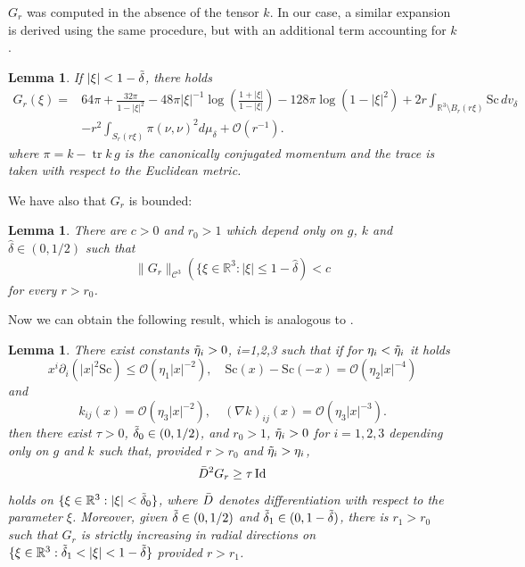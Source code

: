 \documentclass[12pt,a4paper]{amsart}
\theoremstyle{plain}
\newtheorem{lemma}[theorem]{Lemma}
\theoremstyle{definition}
\newcommand{\tr}{\operatorname{tr}}
\begin{document}
$G_r$ was computed in the absence of the tensor $k$. In our case, a similar expansion is derived using the same procedure, but with an additional term accounting for $k$.
\begin{lemma}
    If \(|\xi| < 1 - \Tilde{\delta}\), there holds
\[
\begin{split}
G_r(\xi) =& 64 \pi + \frac{32 \pi}{1 - |\xi|^2} - 48 \pi |\xi|^{-1} \log \left( \frac{1 + |\xi|}{1 - |\xi|} \right) - 128 \pi \log(1 - |\xi|^2) + 2 r \int_{\mathbb{R}^3 \setminus B_r(r \xi)} \mathrm{Sc} \, dv_\delta \\
&-r^2 \int_{S_r(r \xi)} \pi(\nu,\nu)^2 d\mu_\delta +  \mathcal{O} (r^{-1}).
\end{split}
\]
where  $\pi= k-\tr k \, g $ is the canonically conjugated momentum and the trace is taken with respect to the Euclidean metric.
\end{lemma}
We have also that $G_r$ is bounded:
\begin{lemma}\label{bounded}
    There are \(c > 0\) and \(r_0 > 1\) which depend only on \(g\), $k$ and \( \hat{\delta} \in (0, 1/2)\) such that
\[
\|G_r\|_{\mathcal{C}^3}(\{\xi \in \mathbb{R}^3 : |\xi| \leq 1 - \hat{\delta} ) < c
\]
for every \(r > r_0\).
\end{lemma}
Now we can obtain the following result, which is analogous to \cite[Lemma 24]{eichko}. 
\begin{lemma}\label{convexity}
There exist constants $ \Tilde{\eta}_i>0$, i=1,2,3 such that if for $\eta_i< \Tilde{\eta}_i $ it holds 
\begin{equation}
    x^i \partial_i (|x|^2 \mathrm{Sc}) \leq \mathcal{O} (\eta_1 |x|^{-2}),\quad  \mathrm{Sc}(x)-\mathrm{Sc}(-x) = \mathcal{O} (\eta_2 |x|^{-4})
\end{equation}
and 
\begin{equation}
k_{ij}(x) = \mathcal{O}(\eta_3 |x|^{-2}) , \quad (\nabla k)_{ij}(x)= \mathcal{O}(\eta_3 |x|^{-3}). 
\end{equation}
then there exist
\(\tau > 0\), \(\Tilde{\delta}_0 \in (0, 1/2)\), and \(r_0 > 1\), $\Tilde{\eta}_i>0$ for $i=1,2,3$ depending only on \(g\) and $k$ such that, provided \(r > r_0\) and $\Tilde{\eta}_i> \eta_i $,
\[
\Bar{D}^2 G_r \geq \tau \, \text{Id}
\]
holds on \(\{\xi \in \mathbb{R}^3 : |\xi| < \Tilde{\delta}_0\}\), where \(\Bar{D}\) denotes differentiation with respect to the parameter \(\xi\). Moreover, given \(\Tilde{\delta} \in (0, 1/2)\) and \(\Tilde{\delta}_1 \in (0, 1 - \Tilde{\delta})\), there is \(r_1 > r_0\) such
that \(G_r\) is strictly increasing in radial directions on \(\{\xi \in \mathbb{R}^3 : \Tilde{\delta}_1 < |\xi| < 1 - \Tilde{\delta}\}\) provided \(r > r_1\).
\end{lemma}
\end{document}
